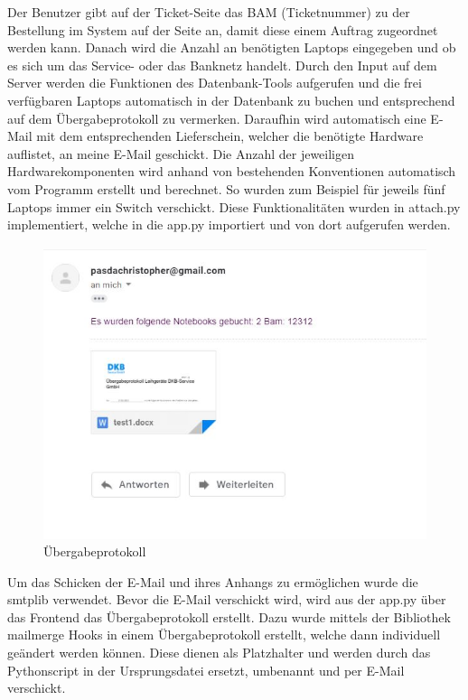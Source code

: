 \noindent
Der Benutzer gibt auf der Ticket-Seite das BAM (Ticketnummer) zu der Bestellung im System auf der Seite an, damit diese einem Auftrag zugeordnet werden kann. Danach wird die Anzahl an benötigten Laptops eingegeben und ob es sich um das Service- oder das Banknetz handelt. Durch den Input auf dem Server werden die Funktionen des Datenbank-Tools aufgerufen und die frei verfügbaren Laptops automatisch in der Datenbank zu buchen und entsprechend auf dem Übergabeprotokoll zu vermerken. Daraufhin wird automatisch eine E-Mail mit dem entsprechenden Lieferschein, welcher die benötigte Hardware auflistet, an meine E-Mail geschickt. Die Anzahl der jeweiligen Hardwarekomponenten wird anhand von bestehenden Konventionen automatisch vom Programm erstellt und berechnet. So wurden zum Beispiel für jeweils fünf Laptops immer ein Switch verschickt. Diese Funktionalitäten wurden in attach.py implementiert, welche in die app.py importiert und von dort aufgerufen werden. 
\begin{figure}[H] 
  \centering
     \includegraphics[width=1\textwidth]{email.jpg}
  \caption{Übergabeprotokoll}
  \label{fig:Bild1}
\end{figure}

\noindent
Um das Schicken der E-Mail und ihres Anhangs zu ermöglichen wurde die smtplib verwendet. Bevor die E-Mail verschickt wird, wird aus der app.py über das Frontend das Übergabeprotokoll erstellt. Dazu wurde mittels der Bibliothek mailmerge Hooks in einem Übergabeprotokoll erstellt, welche dann individuell geändert werden können. Diese dienen als Platzhalter und werden durch das Pythonscript in der Ursprungsdatei ersetzt, umbenannt und per E-Mail verschickt.
\\

